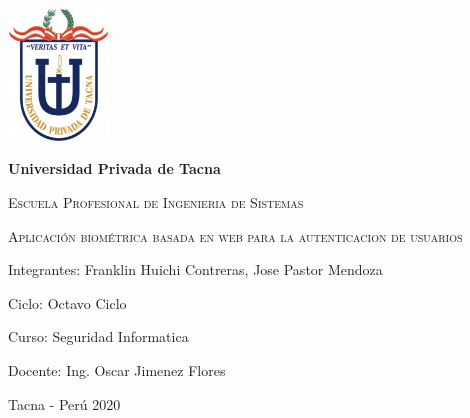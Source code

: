 \documentclass[preprint,12pt]{elsarticle}
\begin{document}
	
\begin{titlepage}
\centering
	{\includegraphics[width=0.2\textwidth]{./IMAGENES/upt}\par}
	\vspace{1cm}
	{\bfseries\LARGE Universidad Privada de Tacna\par}
	\vspace{1cm}
	{\scshape\Large Escuela Profesional de Ingenieria de Sistemas \par}
	\vspace{2cm}
	{\scshape\LARGE Aplicación biométrica basada en web para la autenticacion de usuarios \par}
	\vspace{2cm}
	{\large Integrantes: Franklin Huichi Contreras, Jose Pastor Mendoza \par}
	\vspace{0.1cm}
	{\large Ciclo: Octavo Ciclo \par}
	\vspace{0.1cm}
	{\large Curso: Seguridad Informatica \par}
	\vspace{0.1cm}
	{\large Docente: Ing. Oscar Jimenez Flores\par}
	\vfill
	{\large Tacna - Perú 2020 \par}

\end{titlepage}
\end{document}
